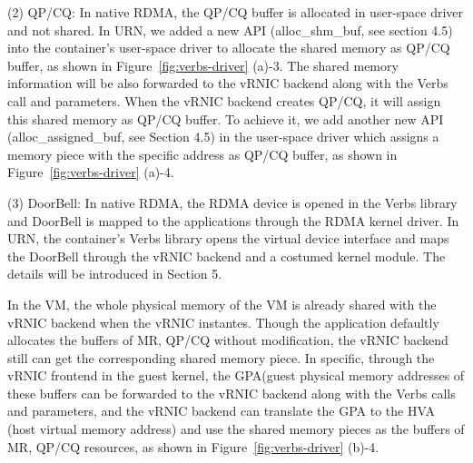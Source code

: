(2) QP/CQ: In native RDMA, the QP/CQ buffer is allocated in user-space driver and not shared. In URN, we added a new API (alloc\_shm\_buf, see section 4.5) into the container's user-space driver to allocate the shared memory as QP/CQ buffer, as shown in Figure~\ref{fig:verbs-driver} (a)-3. The shared memory information will be also forwarded to the vRNIC backend along with the Verbs call and parameters. When the vRNIC backend creates QP/CQ, it will assign this shared memory as QP/CQ buffer. To achieve it, we add another new API (alloc\_assigned\_buf, see Section 4.5) in the user-space driver which assigns a memory piece with the specific address as QP/CQ buffer, as shown in Figure~\ref{fig:verbs-driver} (a)-4.

(3) DoorBell: In native RDMA, the RDMA device is opened in the Verbs library and DoorBell is mapped to the applications through the RDMA kernel driver. In URN, the container's Verbs library opens the virtual device interface and maps the DoorBell through the vRNIC backend and a costumed kernel module. The details will be introduced in Section 5.

In the VM, the whole physical memory of the VM is already shared with the vRNIC backend when the vRNIC instantes. Though the application defaultly allocates the buffers of MR, QP/CQ without modification, the vRNIC backend still can get the corresponding shared memory piece. In specific, through the vRNIC frontend in the guest kernel, the GPA(guest physical memory addresses of these buffers can be forwarded to the vRNIC backend along with the Verbs calls and parameters, and the vRNIC backend can translate the GPA to the HVA (host virtual memory address) and use the shared memory pieces as the buffers of MR, QP/CQ resources, as shown in Figure~\ref{fig:verbs-driver} (b)-4.

